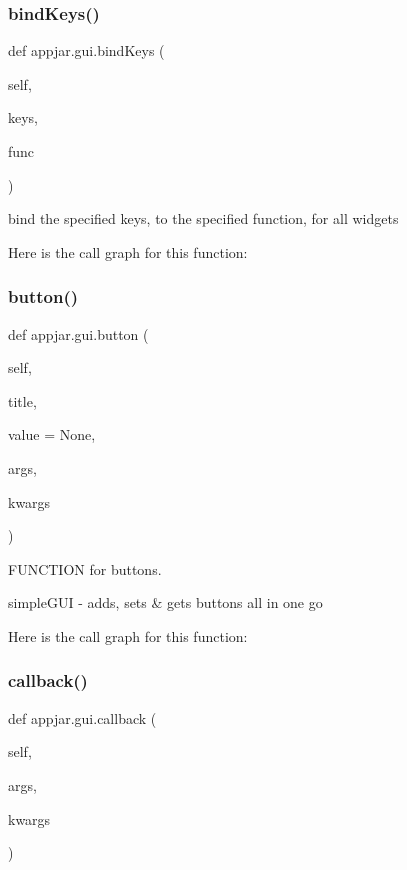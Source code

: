 \subsubsection{\texorpdfstring{bind\+Keys()}{bindKeys()}}
{\footnotesize\ttfamily def appjar.\+gui.\+bind\+Keys (\begin{DoxyParamCaption}\item[{}]{self,  }\item[{}]{keys,  }\item[{}]{func }\end{DoxyParamCaption})}

\begin{DoxyVerb}bind the specified keys, to the specified function, for all widgets \end{DoxyVerb}
 Here is the call graph for this function\+:
\mbox{\label{classappjar_1_1gui_a21ae3947977b2374ac80b900b7a87f41}} 
\subsubsection{\texorpdfstring{button()}{button()}}
{\footnotesize\ttfamily def appjar.\+gui.\+button (\begin{DoxyParamCaption}\item[{}]{self,  }\item[{}]{title,  }\item[{}]{value = {\ttfamily None},  }\item[{}]{args,  }\item[{}]{kwargs }\end{DoxyParamCaption})}



F\+U\+N\+C\+T\+I\+ON for buttons. 

\begin{DoxyVerb}simpleGUI - adds, sets & gets buttons all in one go \end{DoxyVerb}
 Here is the call graph for this function\+:
\mbox{\label{classappjar_1_1gui_a2a2f2b7b9c196be3449f4490fe73ee8d}} 
\subsubsection{\texorpdfstring{callback()}{callback()}}
{\footnotesize\ttfamily def appjar.\+gui.\+callback (\begin{DoxyParamCaption}\item[{}]{self,  }\item[{}]{args,  }\item[{}]{kwargs }\end{DoxyParamCaption})}


